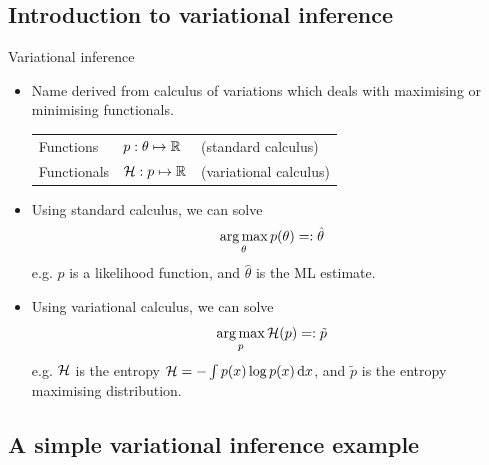 \subsection{Introduction to variational inference}

\begin{frame}{Variational inference}
  \vspace{-10pt}
  \begin{itemize}[<+->]
    \item Name derived from calculus of variations which deals with maximising or minimising functionals.
    \begin{table}
      \begin{tabular}{l  l  l }
      Functions   &$p:\theta \mapsto \mathbb{R}$  &(standard calculus) \\ 
      Functionals &${\mathcal H}:p \mapsto \mathbb{R}$     &(variational calculus) \\ 
      \end{tabular}
    \end{table}
  \item Using standard calculus, we can solve
  \[
    \operatorname*{arg\,max}_\theta p(\theta) =: \hat\theta
  \]
  e.g. $p$ is a likelihood function, and $\hat\theta$ is the ML estimate.
  \item Using variational calculus, we can solve
  \[
    \operatorname*{arg\,max}_p {\mathcal H}(p) =: \tilde p
  \]
  e.g. ${\mathcal H}$ is the entropy ${\mathcal H} = - \int p(x)\log p(x) \, \text{d} x$, and $\tilde p$ is the entropy maximising distribution.
  \end{itemize}
  \vspace{5pt}
\end{frame}

\subsection{A simple variational inference example}


